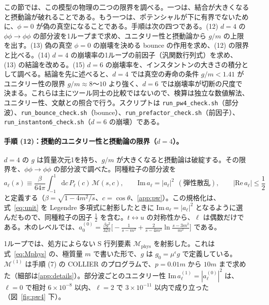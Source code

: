 \documentclass[a4paper,10pt]{ltjsarticle}
\newcommand{\dd}{\mathrm{d}}
\begin{document}
この節では、この模型の物理の二つの限界を調べる。一つは、結合が大きくなると摂動論が破れることである。もう一つは、ポテンシャルが下に有界でないために、$\phi=0$ が偽の真空になることである。手順は次の四つである。(12) $d=4$ の $\phi\phi\to\phi\phi$ の部分波を1ループまで求め、ユニタリー性と摂動論から $g/m$ の上限を出す。(13) 偽の真空 $\phi=0$ の崩壊を決める bounce の作用を求め、(12) の限界と比べる。(14) $d=4$ の崩壊率の1ループの前因子（汎関数行列式）を求め、(13) の結論を改める。(15) $d=6$ の崩壊率を、インスタントンの大きさの積分として調べる。結論を先に述べると、$d=4$ では真空の寿命の条件 $g/m<1.41$ がユニタリー性の限界 $g/m\approx8$〜$10$ より強く、$d=6$ では崩壊率が切断の尺度で決まる。これらは主にツール同士の比較ではないので、検算は独立な数値解法、ユニタリー性、文献との照合で行う。スクリプトは \texttt{run\_pw4\_check.sh}（部分波）、\texttt{run\_bounce\_check.sh}（bounce）、\texttt{run\_prefactor\_check.sh}（前因子）、\texttt{run\_instanton6\_check.sh}（$d=6$ の崩壊）である。

\paragraph{手順 (12)：摂動的ユニタリー性と摂動論の限界（$d=4$）。}$d=4$ の $g$ は質量次元1を持ち、$g/m$ が大きくなると摂動論は破綻する。その限界を、$\phi\phi\to\phi\phi$ の部分波で調べた。同種粒子の部分波を
\begin{equation}
a_\ell(s)\equiv\frac{\beta}{64\pi}\int_{-1}^{1}\dd c\,P_\ell(c)\,\mathcal{M}(s,c),\qquad
\mathrm{Im}\,a_\ell=|a_\ell|^2\ \ (\text{弾性散乱}),\qquad |\mathrm{Re}\,a_\ell|\le\frac12
\label{eq:pw}
\end{equation}
と定義する（$\beta=\sqrt{1-4m^2/s}$、$c=\cos\theta$、\ref{app:pw}）。この規格化は、式~\eqref{eq:unit} を Legendre 多項式に射影したときに $\mathrm{Im}\,a_\ell=|a_\ell|^2$ となるように選んだもので、同種粒子の因子 $\frac12$ を含む。$t\leftrightarrow u$ の対称性から、$\ell$ は偶数だけである。木のレベルでは、$a_0^{(0)}=\frac{\beta g^2}{32\pi}\bigl[-\frac{1}{s-m^2}+\frac{2}{s-4m^2}\ln\frac{s-3m^2}{m^2}\bigr]$ である。

1ループでは、処方によらない S 行列要素 $\mathcal{M}_{\mathrm{phys}}$ を射影した。これは式~\eqref{eq:Mphys} の、極質量 $m$ で書いた形で、$g$ は $g_0=\mu^\epsilon g$ で定義している。$\mathcal{M}^{(1)}$ は手順 (7) の COLLIER のプログラムで、$p=0.01m$ から $10m$ まで求めた（細部は\ref{app:details}）。部分波ごとのユニタリー性 $\mathrm{Im}\,a_\ell^{(1)}=|a_\ell^{(0)}|^2$ は、$\ell=0$ で相対 $6\times10^{-8}$ 以内、$\ell=2$ で $3\times10^{-11}$ 以内で成り立った（図~\ref{fig:pw4} 下）。
\end{document}
